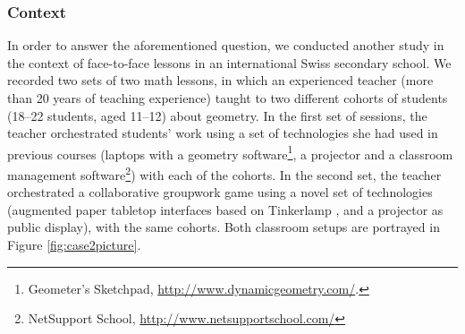 \documentclass[10pt,journal,compsoc]{IEEEtran}
\begin{document}

\subsubsection{Context}

In order to answer the aforementioned question, we conducted another study in the context of face-to-face lessons in an international Swiss secondary school. We recorded two sets of two math lessons, in which an experienced teacher (more than 20 years of teaching experience) taught to two different cohorts of students (18--22 students, aged 11--12) about geometry. In the first set of sessions, the teacher orchestrated students' work using a set of technologies she had used in previous courses (laptops with a geometry software\footnote{Geometer's Sketchpad, \href{http://www.dynamicgeometry.com/}{http://www.dynamicgeometry.com/}.}, a projector and a classroom management software\footnote{NetSupport School, \href{http://www.netsupportschool.com/}{http://www.netsupportschool.com/}}) with each of the cohorts. In the second set, the teacher orchestrated a collaborative groupwork game using a novel set of technologies (augmented paper tabletop interfaces based on Tinkerlamp \cite{do2012tinkerlamp}, and a projector as public display), with the same cohorts. Both classroom setups are portrayed in Figure \ref{fig:case2picture}.


\end{document}
